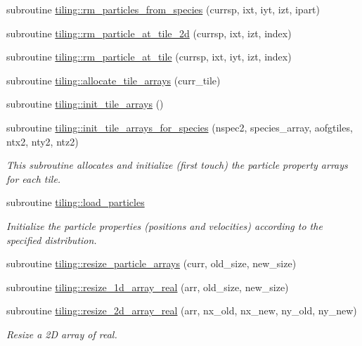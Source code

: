 \begin{DoxyCompactItemize}
\item 
subroutine \hyperlink{namespacetiling_a473875b1f5e9bc6b47ff5d088db15e58}{tiling\+::rm\+\_\+particles\+\_\+from\+\_\+species} (currsp, ixt, iyt, izt, ipart)
\item 
subroutine \hyperlink{namespacetiling_ad6083dac6e2eaccb762ecb829c954898}{tiling\+::rm\+\_\+particle\+\_\+at\+\_\+tile\+\_\+2d} (currsp, ixt, izt, index)
\item 
subroutine \hyperlink{namespacetiling_a7657907098a724d053d587ca73725958}{tiling\+::rm\+\_\+particle\+\_\+at\+\_\+tile} (currsp, ixt, iyt, izt, index)
\item 
subroutine \hyperlink{namespacetiling_aacbab18e61ac532ba396b41bab67a265}{tiling\+::allocate\+\_\+tile\+\_\+arrays} (curr\+\_\+tile)
\item 
subroutine \hyperlink{namespacetiling_a97b828159c1e05df8082c27f3aa61e13}{tiling\+::init\+\_\+tile\+\_\+arrays} ()
\item 
subroutine \hyperlink{namespacetiling_afe5a0a0a27fa1c078f8e69228d0d4a56}{tiling\+::init\+\_\+tile\+\_\+arrays\+\_\+for\+\_\+species} (nspec2, species\+\_\+array, aofgtiles, ntx2, nty2, ntz2)
\begin{DoxyCompactList}\small\item\em This subroutine allocates and initialize (first touch) the particle property arrays for each tile. \end{DoxyCompactList}\item 
subroutine \hyperlink{namespacetiling_ae5c4e98ae7e7957054dda03ab0e298f8}{tiling\+::load\+\_\+particles}
\begin{DoxyCompactList}\small\item\em Initialize the particle properties (positions and velocities) according to the specified distribution. \end{DoxyCompactList}\item 
subroutine \hyperlink{namespacetiling_aaa407b13d58fff3e54b191fa9a8962c0}{tiling\+::resize\+\_\+particle\+\_\+arrays} (curr, old\+\_\+size, new\+\_\+size)
\item 
subroutine \hyperlink{namespacetiling_ad65e35a84d2268ef2b6b4f97f38b18bc}{tiling\+::resize\+\_\+1d\+\_\+array\+\_\+real} (arr, old\+\_\+size, new\+\_\+size)
\item 
subroutine \hyperlink{namespacetiling_afa3d754a121460dce786357819629421}{tiling\+::resize\+\_\+2d\+\_\+array\+\_\+real} (arr, nx\+\_\+old, nx\+\_\+new, ny\+\_\+old, ny\+\_\+new)
\begin{DoxyCompactList}\small\item\em Resize a 2D array of real. \end{DoxyCompactList}\item 

\end{DoxyCompactItemize}
